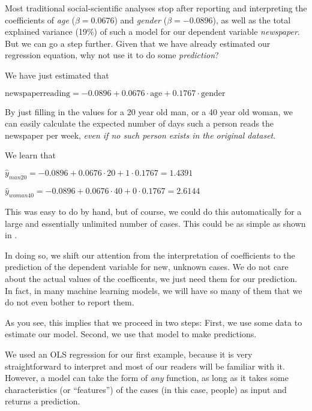 
Most traditional social-scientific analyses stop after reporting and
interpreting the coefficients of \emph{age} ($\beta = 0.0676$) and \emph{gender} ($\beta = -0.0896$), as well as the total explained variance (19\%) of such a model for our dependent variable \emph{newspaper}.
But we can go a step further. Given that we have already estimated our
regression equation, why not use it to do some \textit{prediction}?

We have just estimated that

$\textrm{newspaperreading} = -0.0896 + 0.0676 \cdot \textrm{age} + 0.1767 \cdot \textrm{gender}$

By just filling in the values for a 20 year old man, or a 40 year old
woman, we can easily calculate the expected number of days such a
person reads the newspaper per week, \emph{even if no such person
  exists in the original dataset}.

We learn that

$\hat{y}_{man20} = -0.0896 + 0.0676 \cdot 20 + 1 \cdot 0.1767 = 1.4391$

$\hat{y}_{woman40} = -0.0896 + 0.0676 \cdot 40 + 0 \cdot 0.1767 = 2.6144$

This was easy to do by hand, but of course, we could do this automatically for a large and essentially unlimited number of cases.
This could be as simple as shown in .


In doing so, we shift our attention from the interpretation of coefficients to the prediction of the dependent variable for new, unknown cases. We do not
care about the actual values of the coefficents, we just need them for our prediction.
In fact, in many machine learning models, we will have so many of them that
we do not even bother to report them.

As you see, this implies that we proceed in two steps: First, we use some data
to estimate our model. Second, we use that model to make predictions.

We used an OLS regression for our first example, because it is very
straightforward to interpret and most of our readers will be familiar
with it.  However, a model can take the form of \emph{any} function,
as long as it takes some characteristics (or ``features'') of the
cases (in this case, people) as input and returns a prediction.

